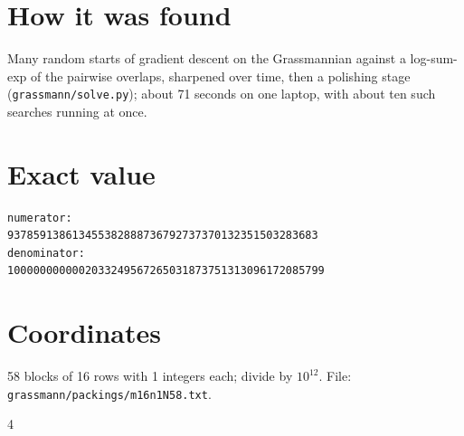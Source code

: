 \documentclass[11pt,a4paper]{article}
\begin{document}
\section{How it was found}
Many random starts of gradient descent on the Grassmannian against a log-sum-exp of the pairwise overlaps, sharpened over time, then a polishing stage (\texttt{grassmann/solve.py}); about 71 seconds on one laptop, with about ten such searches running at once.


\appendix
\section{Exact value}
{\small
\begin{verbatim}
numerator:
937859138613455382888736792737370132351503283683
denominator:
1000000000002033249567265031873751313096172085799
\end{verbatim}}

\section{Coordinates}
58 blocks of 16 rows with 1 integers each; divide by $10^{12}$. File: \texttt{grassmann/packings/m16n1N58.txt}.
{\tiny
\begin{multicols}{4}
\end{multicols}}
\end{document}
